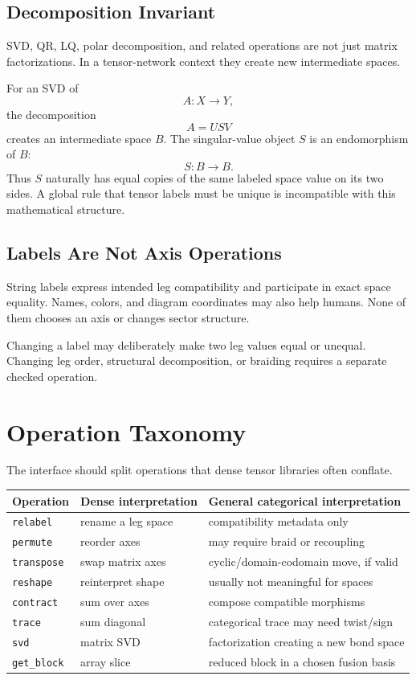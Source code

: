 \documentclass[11pt]{article}
\begin{document}
\subsection{Decomposition Invariant}

SVD, QR, LQ, polar decomposition, and related operations are not just
matrix factorizations.  In a tensor-network context they create new
intermediate spaces.

For an SVD of
\[
  A : X \to Y,
\]
the decomposition
\[
  A = U S V
\]
creates an intermediate space \(B\).  The singular-value object \(S\)
is an endomorphism of \(B\):
\[
  S : B \to B.
\]
Thus \(S\) naturally has equal copies of the same labeled space value
on its two sides.  A
global rule that tensor labels must be unique is incompatible with this
mathematical structure.

\subsection{Labels Are Not Axis Operations}

String labels express intended leg compatibility and participate in
exact space equality.  Names, colors, and diagram coordinates may also
help humans.  None of them chooses an axis or changes sector structure.

Changing a label may deliberately make two leg values equal or unequal.
Changing leg order, structural decomposition, or braiding requires a
separate checked operation.

\section{Operation Taxonomy}

The interface should split operations that dense tensor libraries often
conflate.

\begin{center}
\begin{tabular}{lll}
\toprule
Operation & Dense interpretation & General categorical interpretation \\
\midrule
\texttt{relabel} & rename a leg space & compatibility metadata only \\
\texttt{permute} & reorder axes & may require braid or recoupling \\
\texttt{transpose} & swap matrix axes & cyclic/domain-codomain move, if valid \\
\texttt{reshape} & reinterpret shape & usually not meaningful for spaces \\
\texttt{contract} & sum over axes & compose compatible morphisms \\
\texttt{trace} & sum diagonal & categorical trace may need twist/sign \\
\texttt{svd} & matrix SVD & factorization creating a new bond space \\
\texttt{get\_block} & array slice & reduced block in a chosen fusion basis \\
\bottomrule
\end{tabular}
\end{center}
\end{document}
